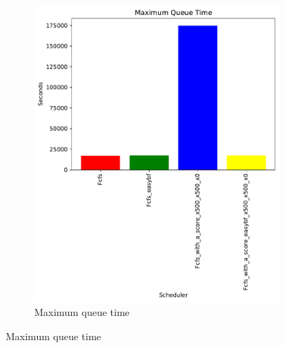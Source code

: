 \documentclass[a4paper]{article}
\begin{document}
\begin{figure}[H]
\begin{subfigure}[b]{0.4\linewidth}\centering\includegraphics[width=1\linewidth]{MBSS/plot/Backfill_2022-01-24->2022-01-24_Maximum_queue_time_450_128_32_256_4_1024.pdf}\caption{Maximum queue time}\label{5}\end{subfigure}

\end{figure}
\end{document}
